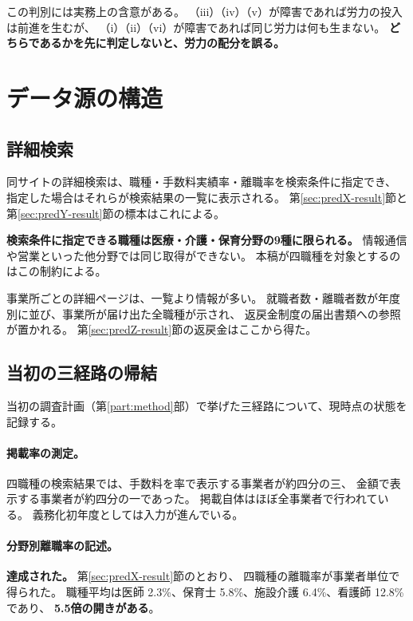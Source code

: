 この判別には実務上の含意がある。
（iii）（iv）（v）が障害であれば労力の投入は前進を生むが、
（i）（ii）（vi）が障害であれば同じ労力は何も生まない。
\textbf{どちらであるかを先に判定しないと、労力の配分を誤る。}

\section{データ源の構造}
\label{sec:pilot}

\subsection{詳細検索}
\label{sec:search-route}

同サイトの詳細検索は、職種・手数料実績率・離職率を検索条件に指定でき、
指定した場合はそれらが検索結果の一覧に表示される。
第\ref{sec:predX-result}節と第\ref{sec:predY-result}節の標本はこれによる。

\textbf{検索条件に指定できる職種は医療・介護・保育分野の9種に限られる。}
情報通信や営業といった他分野では同じ取得ができない。
本稿が四職種を対象とするのはこの制約による。

事業所ごとの詳細ページは、一覧より情報が多い。
就職者数・離職者数が年度別に並び、事業所が届け出た全職種が示され、
返戻金制度の届出書類への参照が置かれる。
第\ref{sec:predZ-result}節の返戻金はここから得た。

\subsection{当初の三経路の帰結}

当初の調査計画（第\ref{part:method}部）で挙げた三経路について、現時点の状態を記録する。

\paragraph{掲載率の測定。}
四職種の検索結果では、手数料を率で表示する事業者が約四分の三、
金額で表示する事業者が約四分の一であった。
掲載自体はほぼ全事業者で行われている。
義務化初年度としては入力が進んでいる。

\paragraph{分野別離職率の記述。}
\textbf{達成された。} 第\ref{sec:predX-result}節のとおり、
四職種の離職率が事業者単位で得られた。
職種平均は医師 2.3\%、保育士 5.8\%、施設介護 6.4\%、看護師 12.8\% であり、
\textbf{5.5倍の開きがある}。

